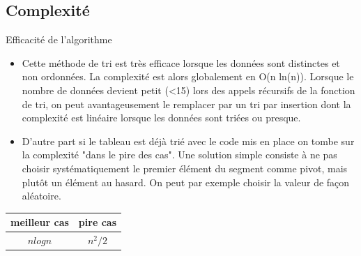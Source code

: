 \subsection{Complexité}
\begin{prop}{Efficacité de l'algorithme}
\begin{itemize}
\item Cette méthode de tri est très efficace lorsque les données sont distinctes et non ordonnées. La complexité est alors globalement en O(n ln(n)). Lorsque le nombre de données devient petit (<15) lors des appels récursifs de la fonction de tri, on peut avantageusement le remplacer par un tri par insertion dont la complexité est linéaire lorsque les données sont triées ou presque. \cite{Beynet}




\item D'autre part si le tableau est déjà trié avec le code mis en place on tombe sur la complexité "dans le pire des cas". Une solution simple consiste à ne pas choisir systématiquement
le premier élément du segment comme pivot, mais plutôt un élément au hasard. On peut par exemple choisir la valeur de façon aléatoire. \cite{wack}
\end{itemize}

\begin{center}
\begin{tabular}{|c|c|}
\hline 
 meilleur cas &  pire cas \\ 
\hline 
$n log n$ & $n^2/2$ \\ 
\hline 
\end{tabular} 
\end{center}



\end{prop}






